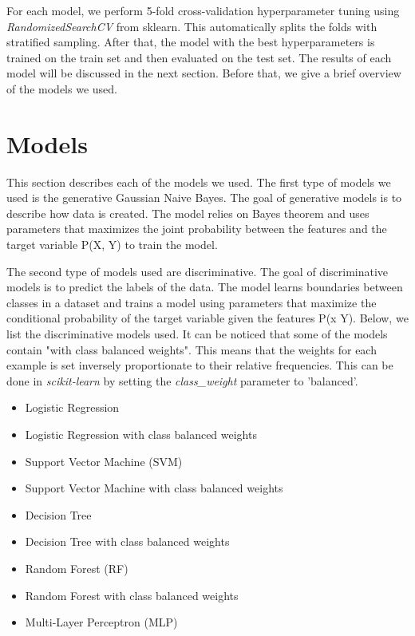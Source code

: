 For each model, we perform 5-fold cross-validation hyperparameter tuning using \textit{RandomizedSearchCV} from sklearn. This automatically splits the folds with stratified sampling. After that, the model with the best hyperparameters is trained on the train set and then evaluated on the test set. The results of each model will be discussed in the next section. Before that, we give a brief overview of the models we used.

\section{Models}

This section describes each of the models we used. The first type of models we used is the generative Gaussian Naive Bayes. The goal of generative models is to describe how data is created. The model relies on Bayes theorem and uses parameters that maximizes the joint probability between the features and the target variable P(X, Y) to train the model.

The second type of models used are discriminative. The goal of discriminative models is to predict the labels of the data. The model learns boundaries between classes in a dataset and trains a model using parameters that maximize the conditional probability of the target variable given the features P(x \textbar Y). Below, we list the discriminative models used. It can be noticed that some of the models contain "with class balanced weights". This means that the weights for each example is set inversely proportionate to their relative frequencies. This can be done in \textit{scikit-learn} by setting the \textit{class\_weight} parameter to 'balanced'.

\begin{itemize}
  \item Logistic Regression
  \item Logistic Regression with class balanced weights
  \item Support Vector Machine (SVM)
  \item Support Vector Machine with class balanced weights
  \item Decision Tree
  \item Decision Tree with class balanced weights
  \item Random Forest (RF)
  \item Random Forest with class balanced weights
  \item Multi-Layer Perceptron (MLP)
\end{itemize}
